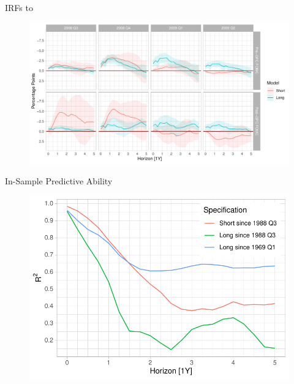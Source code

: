 \documentclass[10pt,aspectratio=169]{beamer}
\begin{document}
\begin{frame}{IRFs to }
    \begin{figure}
        \begin{minipage}{.90\textwidth}
            \includegraphics[width=\textwidth]{irfs_combined_gfc_plot.pdf}
        \end{minipage}
    \end{figure}
\end{frame}

\begin{frame}{In-Sample Predictive Ability}
    \begin{figure}
        \begin{minipage}{0.7\textwidth}
            \includegraphics[width=\textwidth]{r_squares_plot.pdf}
        \end{minipage}
    \end{figure}
\end{frame}


\begin{frame}
\end{frame}
\end{document}
